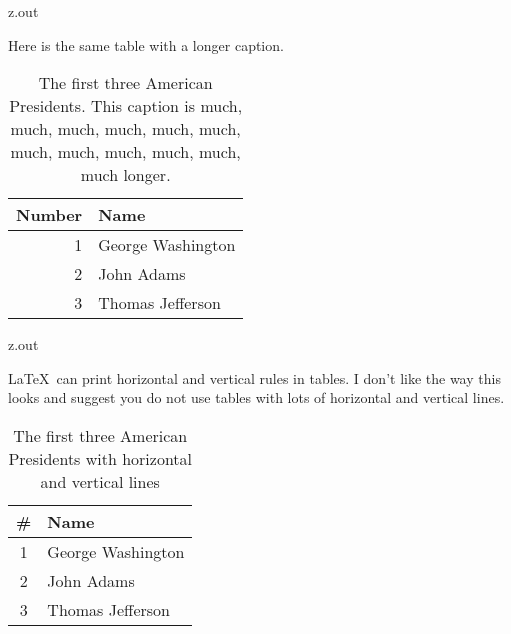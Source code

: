 \MyIO


\begin{VerbatimOut}{z.out}

\newpage

Here is the same table with a longer caption.

\begin{table}[ht]
  \caption{%
    The first three American Presidents.
    This caption is
    much, much, much, much, much, much,
    much, much, much, much, much, much
    longer.%
  }
  \vspace*{6pt}
  \centering
    \begin{tabular}{@{}rl@{}}
      \toprule
      \bf Number& \bf Name\\
      \midrule
      1& George Washington\\
      2& John Adams\\
      3& Thomas Jefferson\\
      \bottomrule
    \end{tabular}
  \label{ta:first-three-american-presidents-longer-caption}
\end{table}
\end{VerbatimOut}

\MyIO


\begin{VerbatimOut}{z.out}

\newpage

\LaTeX\ can print horizontal
and vertical rules in tables.
I don't like the way this looks 
and suggest you do not use tables
with lots of horizontal and vertical lines.
\begin{table}[ht]
  \caption{The first three American Presidents with horizontal and vertical lines}
  \vspace*{6pt}
  \centering
    \begin{tabular}{@{}|c|l|@{}}
      \hline
      \bf \#& \bf Name\\
      \hline
      1& George Washington\\
      \hline
      2& John Adams\\
      \hline
      3& Thomas Jefferson\\
      \hline
    \end{tabular}
  \label{ta:American-Presidents-with-horizontal}
\end{table}
\end{VerbatimOut}

